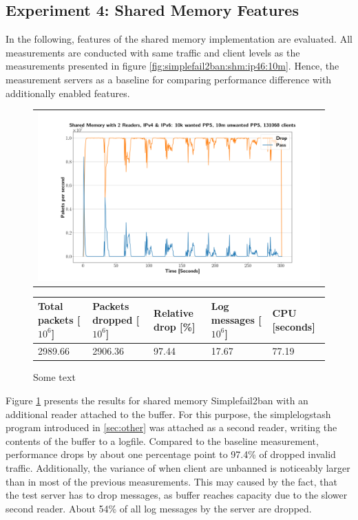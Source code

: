 \pagebreak

\subsection{Experiment 4: Shared Memory Features}

In the following, features of the shared memory implementation are evaluated. All measurements are conducted with same traffic and client levels as the measurements presented in figure \ref{fig:simplefail2ban:shm:ip46:10m}.
Hence, the measurement servers as a baseline for comparing performance difference with additionally enabled features.

\begin{figure}[!h]
	\centering
	\scriptsize
	\begin{tabular}{c}
    	\centerline{\includegraphics[width=1.2\textwidth]{images/simplefail2ban_shm_2r_ipv46_v10k_iv10m_c131068.png}}
	\end{tabular}
	\begin{tabular}{lllll}
		\toprule
		\textbf{Total packets [$10^6$]} & \textbf{Packets dropped [$10^6$]} & \textbf{Relative drop [\%]} & \textbf{Log messages [$10^6$]} & \textbf{CPU [seconds]} \\ \midrule 
		2989.66 & 2906.36 & 97.44 & 17.67 & 77.19 \\
		\bottomrule
	\end{tabular}
	\caption[Simplefail2ban, Shared Memory 2 Readers]{Some text}
	\label{fig:simplefail2ban:shm:2r}
\end{figure}

Figure \ref{fig:simplefail2ban:shm:2r} presents the results for shared memory Simplefail2ban with an additional reader attached to the buffer. For this purpose, the simplelogstash
program introduced in \ref{sec:other} was attached as a second reader, writing the contents of the buffer to a logfile. Compared to the baseline measurement, performance drops by about one percentage
point to 97.4\% of dropped invalid traffic. Additionally, the variance of when client are unbanned is noticeably larger
than in most of the previous measurements. This may caused by the fact, that the test server has to drop messages, as buffer reaches capacity due to the slower second reader.
About 54\% of all log messages by the server are dropped.   

